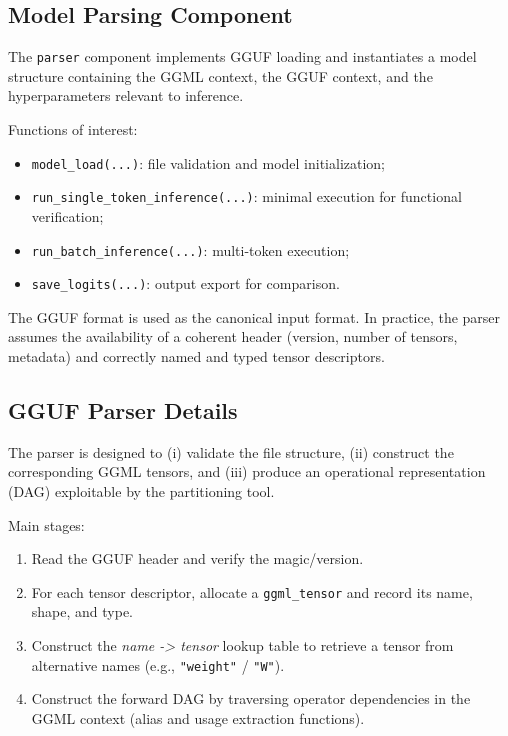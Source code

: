 \documentclass[11pt,a4paper]{article}
\begin{document}
\subsection{Model Parsing Component}

The \texttt{parser} component implements GGUF loading and instantiates a model structure containing the GGML context, the GGUF context, and the hyperparameters relevant to inference.

Functions of interest:
\begin{itemize}[leftmargin=*]
	\item \texttt{model\_load(...)}: file validation and model initialization;
	\item \texttt{run\_single\_token\_inference(...)}: minimal execution for functional verification;
	\item \texttt{run\_batch\_inference(...)}: multi-token execution;
	\item \texttt{save\_logits(...)}: output export for comparison.
\end{itemize}

The GGUF format is used as the canonical input format. In practice, the parser assumes the availability of a coherent header (version, number of tensors, metadata) and correctly named and typed tensor descriptors.

\subsection{GGUF Parser Details}

The parser is designed to (i) validate the file structure, (ii) construct the corresponding GGML tensors, and (iii) produce an operational representation (DAG) exploitable by the partitioning tool.

Main stages:
\begin{enumerate}[leftmargin=*]
	\item Read the GGUF header and verify the magic/version.
	\item For each tensor descriptor, allocate a \texttt{ggml\_tensor} and record its name, shape, and type.
	\item Construct the \textit{name -> tensor} lookup table to retrieve a tensor from alternative names (e.g., \texttt{"weight"} / \texttt{"W"}).
	\item Construct the forward DAG by traversing operator dependencies in the GGML context (alias and usage extraction functions).
\end{enumerate}
\end{document}
